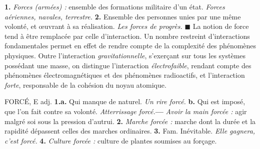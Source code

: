  {\bf 1.} {\it Forces (armées) :} ensemble des formations militaire d'un état. {\it Forces aériennes, navales, terrestre.} {\bf 2.} Ensemble des personnes unies par une même volonté, et œuvrant à sa réalisation. {\it Les forces de progrès.} 
$\blacksquare$ 
La notion de force tend à être remplacée par celle d'interaction. Un nombre restreint d'interactions fondamentales permet en effet de rendre compte de la complexité des phénomènes physiques. Outre l'interaction {\it gravitationnelle}, s'exerçant sur tous les systèmes possédant une masse, on distingue l'interaction {\it électrofaible}, rendant compte des phénomènes électromagnétiques et des phénomènes radioactifs, et l'interaction {\it forte}, responsable de la cohésion du noyau atomique.

\vspace{0.24cm}
{\footnotesize 
FORCÉ, E {\sf adj.} {\bf 1.a.} Qui manque de naturel. {\it Un rire forcé.} {\bf b.} Qui est imposé, que l'on fait contre sa volonté. {\it Atterrissage forcé.}{\bf —} {\it Avoir la main forcée :} agir malgré soi sous la pression d'autrui. {\bf 2.} {\it Marche forcée :} marche dont la durée et la rapidité dépassent celles des marches ordinaires. {\bf 3.} {\sf Fam.} Inévitable. {\it Elle gagnera, c'est forcé.} {\bf 4.} {\it Culture forcée :} culture de plantes soumises au forçage.
}
\vspace{0.31cm}
